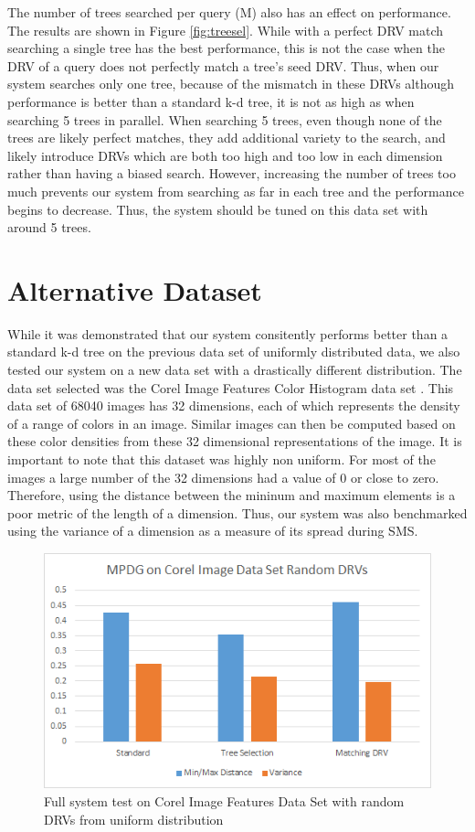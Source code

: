 The number of trees searched per query (M) also has an effect on performance.  The results are shown in Figure \ref{fig:treesel}.  While with a perfect DRV match searching a single tree has the best performance, this is not the case when the DRV of a query does not perfectly match a tree's seed DRV.  Thus, when our system searches only one tree, because of the mismatch in these DRVs although performance is better than a standard k-d tree, it is not as high as when searching 5 trees in parallel.  When searching 5 trees, even though none of the trees are likely perfect matches, they add additional variety to the search, and likely introduce DRVs which are both too high and too low in each dimension rather than having a biased search.  However, increasing the number of trees too much prevents our system from searching as far in each tree and the performance begins to decrease.  Thus, the system should be tuned on this data set with around 5 trees.

\section{Alternative Dataset}

While it was demonstrated that our system consitently performs better than a standard k-d tree on the previous data set of uniformly distributed data, we also tested our system on a new data set with a drastically different distribution.  The data set selected was the Corel Image Features Color Histogram data set \citep{corelimage}. This data set of 68040 images has 32 dimensions, each of which represents the density of a range of colors in an image.  Similar images can then be computed based on these color densities from these 32 dimensional representations of the image.  It is important to note that this dataset was highly non uniform.  For most of the images a large number of the 32 dimensions had a value of 0 or close to zero.  Therefore, using the distance between the mininum and maximum elements is a poor metric of the length of a dimension.  Thus, our system was also benchmarked using the variance of a dimension as a measure of its spread during SMS.

\begin{figure}[h]
\begin{center}
\includegraphics[width=.85\textwidth]{Figures/altrand}
\end{center}
\caption{Full system test on Corel Image Features Data Set with random DRVs from uniform distribution}
\label{fig:altrand}
\end{figure}

